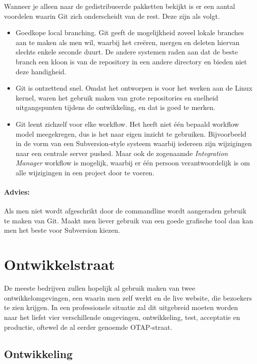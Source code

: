 Wanneer je alleen naar de gedistribueerde pakketten bekijkt is er een aantal voordelen waarin Git zich onderscheidt van de rest. Deze zijn als volgt.

\begin{itemize}
  \item Goedkope local branching. Git geeft de mogelijkheid zoveel lokale branches aan te maken als men wil, waarbij het creëren, mergen en deleten hiervan slechts enkele seconde duurt. De andere systemen raden aan dat de beste branch een kloon is van de repository in een andere directory en bieden niet deze handigheid.
  \item Git is ontzettend snel\cite{whygitisbetterthanx}. Omdat het ontworpen is voor het werken aan de Linux kernel, waren het gebruik maken van grote repositories en snelheid uitgangspunten tijdens de ontwikkeling, en dat is goed te merken.
  \item Git leent zichzelf voor elke workflow. Het heeft niet één bepaald workflow model meegekregen, dus is het naar eigen inzicht te gebruiken. Bijvoorbeeld in de vorm van een Subversion-style systeem waarbij iedereen zijn wijzigingen naar een centrale server pushed. Maar ook de zogenaamde \emph{Integration Manager} workflow is mogelijk, waarbij er één persoon verantwoordelijk is om alle wijzigingen in een project door te voeren.
\end{itemize}

\paragraph{Advies:} Als men niet wordt afgeschrikt door de commandline wordt aangeraden gebruik te maken van Git. Maakt men liever gebruik van een goede grafische tool dan kan men het beste voor Subversion kiezen.

\section{Ontwikkelstraat}

De meeste bedrijven zullen hopelijk al gebruik maken van twee ontwikkelomgevingen, een waarin men zelf werkt en de live website, die bezoekers te zien krijgen. In een professionele situatie zal dit uitgebreid moeten worden naar het liefst vier verschillende omgevingen, ontwikkeling, test, acceptatie en productie, oftewel de al eerder genoemde OTAP-straat. 

\subsection{Ontwikkeling}

